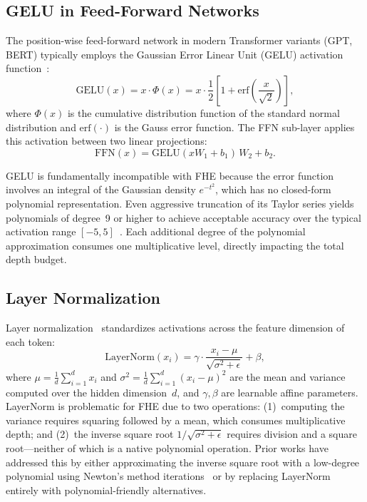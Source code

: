 \subsection{GELU in Feed-Forward Networks}

The position-wise feed-forward network in modern Transformer variants (GPT, BERT) typically employs the Gaussian Error Linear Unit (GELU) activation function~\cite{hendrycks2016gaussian}:
\begin{equation}
    \mathrm{GELU}(x) = x \cdot \Phi(x) = x \cdot \frac{1}{2}\left[1 + \mathrm{erf}\!\left(\frac{x}{\sqrt{2}}\right)\right],
    \label{eq:gelu}
\end{equation}
where $\Phi(x)$ is the cumulative distribution function of the standard normal distribution and $\mathrm{erf}(\cdot)$ is the Gauss error function. The FFN sub-layer applies this activation between two linear projections:
\begin{equation}
    \mathrm{FFN}(x) = \mathrm{GELU}(x W_1 + b_1)\, W_2 + b_2.
    \label{eq:ffn}
\end{equation}

GELU is fundamentally incompatible with FHE because the error function involves an integral of the Gaussian density $e^{-t^2}$, which has no closed-form polynomial representation. Even aggressive truncation of its Taylor series yields polynomials of degree~9 or higher to achieve acceptable accuracy over the typical activation range $[-5, 5]$~\cite{lee2022lowcomplexity}. Each additional degree of the polynomial approximation consumes one multiplicative level, directly impacting the total depth budget.

\subsection{Layer Normalization}

Layer normalization~\cite{ba2016layer} standardizes activations across the feature dimension of each token:
\begin{equation}
    \mathrm{LayerNorm}(x_i) = \gamma \cdot \frac{x_i - \mu}{\sqrt{\sigma^2 + \epsilon}} + \beta,
    \label{eq:layernorm}
\end{equation}
where $\mu = \frac{1}{d}\sum_{i=1}^{d} x_i$ and $\sigma^2 = \frac{1}{d}\sum_{i=1}^{d}(x_i - \mu)^2$ are the mean and variance computed over the hidden dimension~$d$, and $\gamma, \beta$ are learnable affine parameters. LayerNorm is problematic for FHE due to two operations: (1)~computing the variance requires squaring followed by a mean, which consumes multiplicative depth; and (2)~the inverse square root $1/\sqrt{\sigma^2 + \epsilon}$ requires division and a square root---neither of which is a native polynomial operation. Prior works have addressed this by either approximating the inverse square root with a low-degree polynomial using Newton's method iterations~\cite{hao2022iron} or by replacing LayerNorm entirely with polynomial-friendly alternatives.

